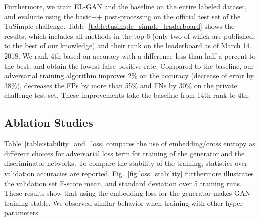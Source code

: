 \documentclass{article} \usepackage{nips13submit_e,times}
\newcommand{\elgan}{\mbox{EL-GAN}}
\begin{document}
Furthermore, we train \elgan{} and the baseline on the entire labeled dataset, and evaluate using the basic++ post-processing on the official test set of the TuSimple challenge.
Table~\ref{table:tusimple_simple_leaderboard} shows the results, which includes all methods in the top 6 (only two of which are published, to the best of our knowledge) and their rank on the leaderboard as of March 14, 2018.
We rank 4th based on accuracy with a difference less than half a percent to the best, and obtain the lowest false positive rate.
Compared to the baseline, our adversarial training algorithm improves 2\% on the accuracy (decrease of error by 38\%), decreases the FPs by more than 55\% and FNs by 30\% on the private challenge test set. 
These improvements take the baseline from 14th rank to 4th.




















\subsection{Ablation Studies}
\label{sec:ablation_studies}

Table~\ref{table:stability_and_loss} compares the use of embedding/cross entropy as different choices for adversarial loss term for training of the generator and the discriminator networks.
To compare the stability of the training, statistics over validation accuracies are reported.
Fig.~\ref{fig:loss_stability} furthermore illustrates the validation set F-score mean, and standard deviation over 5 training runs.
These results show that using the embedding loss for the generator makes GAN training stable.
We observed similar behavior when training with other hyper-parameters.
\end{document}
